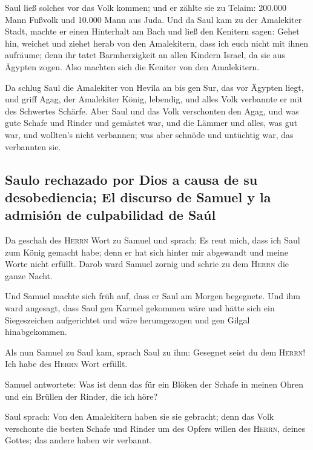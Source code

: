  Saul ließ solches vor das Volk kommen; und er zählte sie
zu Telaim: 200.000 Mann Fußvolk und 10.000 Mann aus Juda. 
Und da Saul kam zu der Amalekiter Stadt, machte er einen Hinterhalt am
Bach  und ließ den Kenitern sagen: Gehet hin, weichet und
ziehet herab von den Amalekitern, dass ich euch nicht mit ihnen
aufräume; denn ihr tatet Barmherzigkeit an allen Kindern Israel, da sie
aus Ägypten zogen. Also machten sich die Keniter von den Amalekitern.

 Da schlug Saul die Amalekiter von Hevila an bis gen Sur,
das vor Ägypten liegt,  und griff Agag, der Amalekiter
König, lebendig, und alles Volk verbannte er mit des Schwertes Schärfe.
 Aber Saul und das Volk verschonten den Agag, und was gute
Schafe und Rinder und gemästet war, und die Lämmer und alles, was gut
war, und wollten's nicht verbannen; was aber schnöde und untüchtig war,
das verbannten sie.

\hypertarget{saulo-rechazado-por-dios-a-causa-de-su-desobediencia-el-discurso-de-samuel-y-la-admisiuxf3n-de-culpabilidad-de-sauxfal}{%
\subsection{Saulo rechazado por Dios a causa de su desobediencia; El
discurso de Samuel y la admisión de culpabilidad de
Saúl}\label{saulo-rechazado-por-dios-a-causa-de-su-desobediencia-el-discurso-de-samuel-y-la-admisiuxf3n-de-culpabilidad-de-sauxfal}}

 Da geschah des \textsc{Herrn} Wort zu Samuel und sprach:
 Es reut mich, dass ich Saul zum König gemacht habe; denn
er hat sich hinter mir abgewandt und meine Worte nicht erfüllt. Darob
ward Samuel zornig und schrie zu dem \textsc{Herrn} die ganze Nacht.

 Und Samuel machte sich früh auf, dass er Saul am Morgen
begegnete. Und ihm ward angesagt, dass Saul gen Karmel gekommen wäre und
hätte sich ein Siegeszeichen aufgerichtet und wäre herumgezogen und gen
Gilgal hinabgekommen.

 Als nun Samuel zu Saul kam, sprach Saul zu ihm: Gesegnet
seist du dem \textsc{Herrn}! Ich habe des \textsc{Herrn} Wort erfüllt.

 Samuel antwortete: Was ist denn das für ein Blöken der
Schafe in meinen Ohren und ein Brüllen der Rinder, die ich höre?

 Saul sprach: Von den Amalekitern haben sie sie gebracht;
denn das Volk verschonte die besten Schafe und Rinder um des Opfers
willen des \textsc{Herrn}, deines Gottes; das andere haben wir verbannt.

